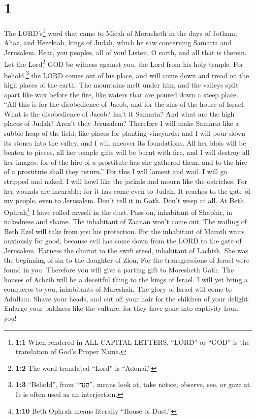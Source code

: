 \hypertarget{section}{%
\section{1}\label{section}}

 The LORD's\footnote{\textbf{1:1} When rendered in ALL
  CAPITAL LETTERS, ``LORD'' or ``GOD'' is the translation of God's
  Proper Name.} word that came to Micah of Morasheth in the days of
Jotham, Ahaz, and Hezekiah, kings of Judah, which he saw concerning
Samaria and Jerusalem.  Hear, you peoples, all of you!
Listen, O earth, and all that is therein. Let the Lord\footnote{\textbf{1:2}
  The word translated ``Lord'' is ``Adonai.''} GOD be witness against
you, the Lord from his holy temple.  For
behold,\footnote{\textbf{1:3} ``Behold'', from ``הִנֵּה'', means look
  at, take notice, observe, see, or gaze at. It is often used as an
  interjection.} the LORD comes out of his place, and will come down and
tread on the high places of the earth.  The mountains melt
under him, and the valleys split apart like wax before the fire, like
waters that are poured down a steep place.  ``All this is
for the disobedience of Jacob, and for the sins of the house of Israel.
What is the disobedience of Jacob? Isn't it Samaria? And what are the
high places of Judah? Aren't they Jerusalem?  Therefore I
will make Samaria like a rubble heap of the field, like places for
planting vineyards; and I will pour down its stones into the valley, and
I will uncover its foundations.  All her idols will be
beaten to pieces, all her temple gifts will be burnt with fire, and I
will destroy all her images; for of the hire of a prostitute has she
gathered them, and to the hire of a prostitute shall they return.''
 For this I will lament and wail. I will go stripped and
naked. I will howl like the jackals and mourn like the ostriches.
 For her wounds are incurable; for it has come even to
Judah. It reaches to the gate of my people, even to Jerusalem.
 Don't tell it in Gath. Don't weep at all. At Beth
Ophrah\footnote{\textbf{1:10} Beth Ophrah means literally ``House of
  Dust.''} I have rolled myself in the dust.  Pass on,
inhabitant of Shaphir, in nakedness and shame. The inhabitant of Zaanan
won't come out. The wailing of Beth Ezel will take from you his
protection.  For the inhabitant of Maroth waits anxiously
for good, because evil has come down from the LORD to the gate of
Jerusalem.  Harness the chariot to the swift steed,
inhabitant of Lachish. She was the beginning of sin to the daughter of
Zion; For the transgressions of Israel were found in you.
 Therefore you will give a parting gift to Moresheth
Gath. The houses of Achzib will be a deceitful thing to the kings of
Israel.  I will yet bring a conqueror to you, inhabitants
of Mareshah. The glory of Israel will come to Adullam. 
Shave your heads, and cut off your hair for the children of your
delight. Enlarge your baldness like the vulture, for they have gone into
captivity from you!

